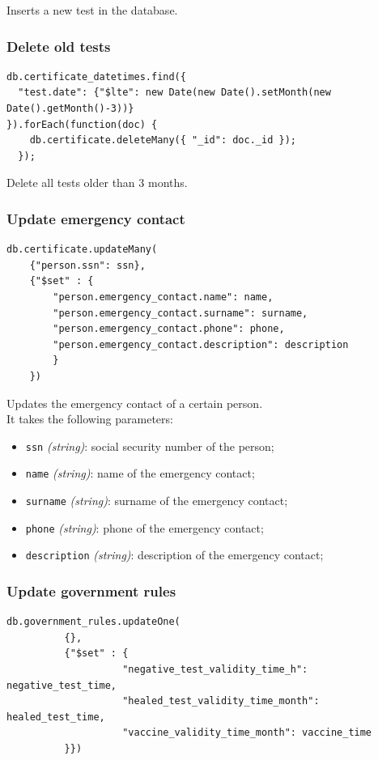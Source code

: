 \documentclass[12pt, a4paper]{article}
\begin{document}
\noindent
Inserts a new test in the database. 

\subsubsection{Delete old tests}
\begin{tcolorbox}[fontupper=\scriptsize]
    \begin{verbatim}
db.certificate_datetimes.find({ 
  "test.date": {"$lte": new Date(new Date().setMonth(new Date().getMonth()-3))}
}).forEach(function(doc) {
    db.certificate.deleteMany({ "_id": doc._id });
  });
      \end{verbatim}
\end{tcolorbox}

\noindent
Delete all tests older than 3 months.

\subsubsection{Update emergency contact}
\begin{tcolorbox}[fontupper=\scriptsize]
    \begin{verbatim}
db.certificate.updateMany(
	{"person.ssn": ssn},
	{"$set" : {
		"person.emergency_contact.name": name,
		"person.emergency_contact.surname": surname,
		"person.emergency_contact.phone": phone,
		"person.emergency_contact.description": description	
		}
	})
      \end{verbatim}
\end{tcolorbox}

\noindent
Updates the emergency contact of a certain person. \\
It takes the following parameters:
\begin{itemize}
    \item \texttt{ssn} \emph{(string)}: social security number of the person;
    \item \texttt{name} \emph{(string)}: name of the emergency contact;
    \item \texttt{surname} \emph{(string)}: surname of the emergency contact;
    \item \texttt{phone} \emph{(string)}: phone of the emergency contact;
    \item \texttt{description} \emph{(string)}: description of the emergency contact;
 \end{itemize}

\subsubsection{Update government rules} 
\begin{tcolorbox}[fontupper=\scriptsize]
    \begin{verbatim}
db.government_rules.updateOne(
          {},
          {"$set" : { 
                    "negative_test_validity_time_h": negative_test_time,
                    "healed_test_validity_time_month": healed_test_time, 
                    "vaccine_validity_time_month": vaccine_time
          }})
      \end{verbatim}
\end{tcolorbox}
\end{document}
